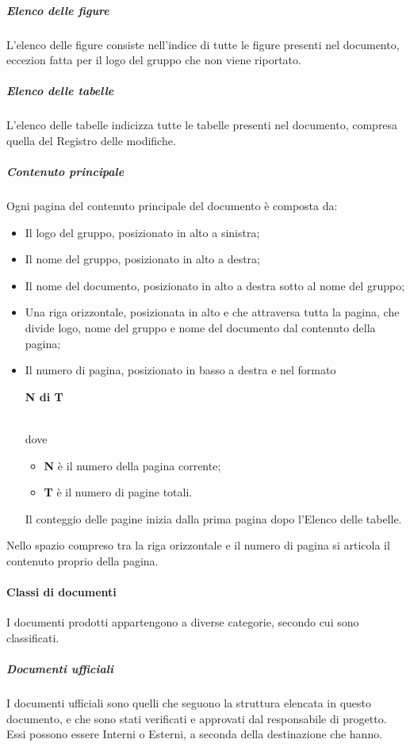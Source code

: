 \documentclass[../norme-di-progetto.tex]{subfiles}
\begin{document}
\subparagraph{Elenco delle figure}
L'elenco delle figure consiste nell'indice di tutte le figure presenti nel documento, eccezion fatta per il logo del gruppo che non viene riportato.

\subparagraph{Elenco delle tabelle}
L'elenco delle tabelle indicizza tutte le tabelle presenti nel documento, compresa quella del Registro delle modifiche.

\subparagraph{Contenuto principale}
Ogni pagina del contenuto principale del documento è composta da:
\begin{itemize}
  \item Il logo del gruppo, posizionato in alto a sinistra;
  \item Il nome del gruppo, posizionato in alto a destra;
  \item Il nome del documento, posizionato in alto a destra sotto al nome del gruppo;
  \item Una riga orizzontale, posizionata in alto e che attraversa tutta la pagina, che divide logo, nome del gruppo e nome del documento dal contenuto della pagina;
  \item Il numero di pagina, posizionato in basso a destra e nel formato \\ \centerline{\textbf{N di T}} \\ dove
\begin{itemize}
  \item \textbf{N} è il numero della pagina corrente;
  \item \textbf{T} è il numero di pagine totali.
\end{itemize}
Il conteggio delle pagine inizia dalla prima pagina dopo l'Elenco delle tabelle.
\end{itemize}
Nello spazio compreso tra la riga orizzontale e il numero di pagina si articola il contenuto proprio della pagina.

\paragraph{Classi di documenti}
I documenti prodotti appartengono a diverse categorie, secondo cui sono classificati.

\subparagraph{Documenti ufficiali}
I documenti ufficiali sono quelli che seguono la struttura elencata in questo documento, e che sono stati verificati e approvati dal responsabile di progetto. Essi possono essere Interni o Esterni, a seconda della destinazione che hanno.
\end{document}
